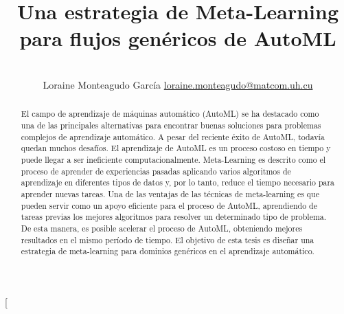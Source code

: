 \documentclass[a4paper,10pt,twocolumn]{article}
\title{Una estrategia de Meta-Learning para flujos genéricos de AutoML}
\author{\\
\name Loraine Monteagudo García \email \href{loraine.monteagudo@matcom.uh.cu}{loraine.monteagudo@matcom.uh.cu}
	}
\begin{document}
\twocolumn[

\maketitle


\begin{abstract}

	El campo de aprendizaje de máquinas automático (AutoML) se ha destacado como una de las principales alternativas para encontrar buenas soluciones para problemas complejos de aprendizaje automático. A pesar del reciente éxito de AutoML, todavía quedan muchos desafíos. El aprendizaje de AutoML es un proceso costoso en tiempo y puede llegar a ser ineficiente computacionalmente. Meta-Learning es descrito como el proceso de aprender de experiencias pasadas aplicando varios algoritmos de aprendizaje en diferentes tipos de datos y, por lo tanto, reduce el tiempo necesario para aprender nuevas tareas. Una de las ventajas de las técnicas de meta-learning es que pueden servir como un apoyo eficiente para el proceso de AutoML, aprendiendo de tareas previas los mejores algoritmos para resolver un determinado tipo de problema. De esta manera, es posible acelerar el proceso de AutoML, obteniendo mejores resultados en el mismo período de tiempo. El objetivo de esta tesis es diseñar una estrategia de meta-learning para dominios genéricos en el aprendizaje automático.

\end{abstract}

\vspace{0.5cm}
\end{document}
